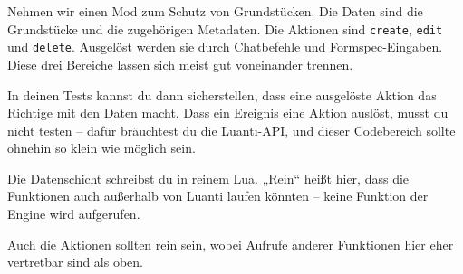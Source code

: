 Nehmen wir einen Mod zum Schutz von Grundstücken. Die Daten sind die
Grundstücke und die zugehörigen Metadaten.
Die Aktionen sind \texttt{create}, \texttt{edit} und \texttt{delete}.
Ausgelöst werden sie durch Chatbefehle und
Formspec-Eingaben. Diese drei Bereiche lassen sich meist gut voneinander
trennen.

In deinen Tests kannst du dann sicherstellen, dass eine ausgelöste
Aktion das Richtige mit den Daten macht. Dass ein Ereignis eine Aktion
auslöst, musst du nicht testen -- dafür bräuchtest du die Luanti-API,
und dieser Codebereich sollte ohnehin so klein wie möglich sein.

Die Datenschicht schreibst du in reinem Lua. „Rein`` heißt hier, dass
die Funktionen auch außerhalb von Luanti laufen könnten -- keine
Funktion der Engine wird aufgerufen.

\begin{Shaded}
\begin{Highlighting}[]
 \OperatorTok{(}\OperatorTok{,} \OperatorTok{)}
    \OperatorTok{[}\OperatorTok{]} \OperatorTok{=} \OperatorTok{\{}
         \OperatorTok{=} \OperatorTok{,}
         \OperatorTok{=} \OperatorTok{,}
    \OperatorTok{\}}

 \OperatorTok{(}\OperatorTok{)}
     \OperatorTok{[}\OperatorTok{]}
\end{Highlighting}
\end{Shaded}

Auch die Aktionen sollten rein sein, wobei Aufrufe anderer Funktionen
hier eher vertretbar sind als oben.

